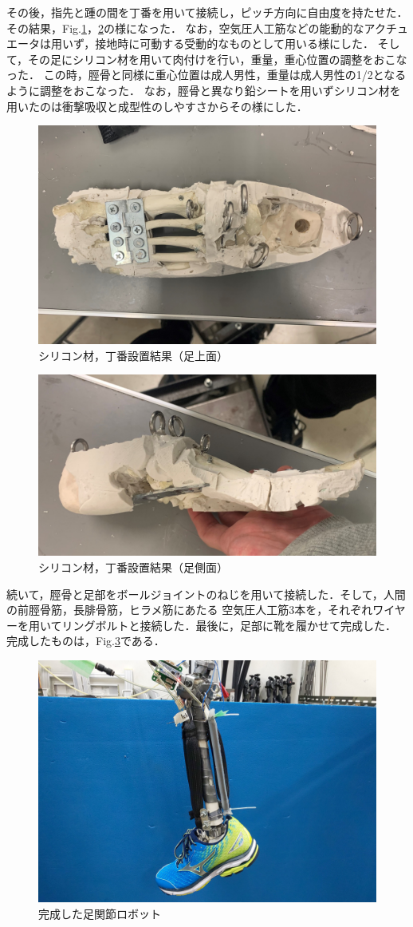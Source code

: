 \newpage
その後，指先と踵の間を丁番を用いて接続し，ピッチ方向に自由度を持たせた．その結果，Fig.\ref{fig:foot2}，\ref{fig:footside2}の様になった．
なお，空気圧人工筋などの能動的なアクチュエータは用いず，接地時に可動する受動的なものとして用いる様にした．
そして，その足にシリコン材を用いて肉付けを行い，重量，重心位置の調整をおこなった．
この時，脛骨と同様に重心位置は成人男性，重量は成人男性の1/2となるように調整をおこなった．
なお，脛骨と異なり鉛シートを用いずシリコン材を用いたのは衝撃吸収と成型性のしやすさからその様にした．
\begin{figure}[h]
    \begin{center}
     \includegraphics[width=0.6\columnwidth,clip]{./2_measurement/siliconfoot.eps}
     \caption{シリコン材，丁番設置結果（足上面）}
     \label{fig:foot2}
    \end{center}
\end{figure}
\begin{figure}[h]
    \begin{center}
     \includegraphics[width=0.6\columnwidth,clip]{./2_measurement/siliconfootside.eps}
     \caption{シリコン材，丁番設置結果（足側面）}
     \label{fig:footside2}
    \end{center}
\end{figure}
\newpage
続いて，脛骨と足部をボールジョイントのねじを用いて接続した．そして，人間の前脛骨筋，長腓骨筋，ヒラメ筋にあたる
空気圧人工筋3本を，それぞれワイヤーを用いてリングボルトと接続した．最後に，足部に靴を履かせて完成した．
完成したものは，Fig.\ref{fig:fin}である．

\begin{figure}[h]
    \begin{center}
     \includegraphics[width=0.6\columnwidth,clip]{./2_measurement/fin.eps}
     \caption{完成した足関節ロボット}
     \label{fig:fin}
    \end{center}
\end{figure}